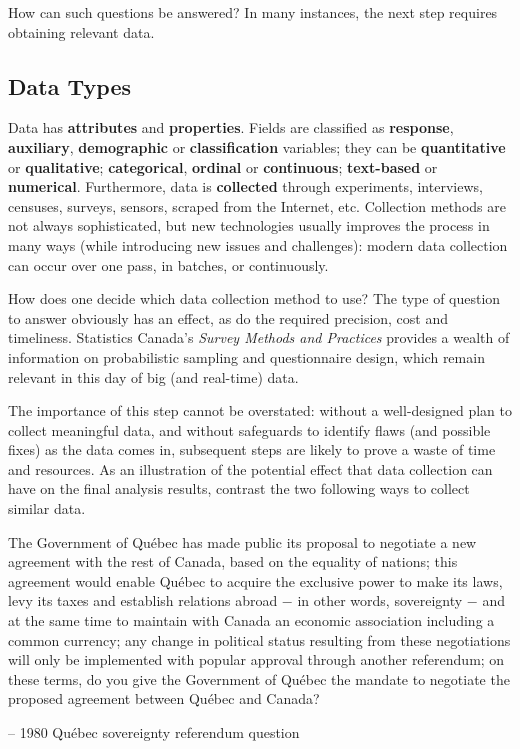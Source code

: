 \noindent How can such questions be answered? In many instances, the next step requires obtaining relevant data.   
\subsection{Data Types} 
Data has \textbf{attributes} and \textbf{properties}. Fields are classified as \textbf{response}, \textbf{auxiliary}, \textbf{demographic} or \textbf{classification} variables; they can be \textbf{quantitative} or \textbf{qualitative}; \textbf{categorical}, \textbf{ordinal} or \textbf{continuous}; \textbf{text-based} or \textbf{numerical}. Furthermore, data is \textbf{collected} through experiments, interviews, censuses, surveys, sensors, scraped from the Internet, etc. 
\newl  Collection methods are not always sophisticated, but new technologies usually improves the process in many ways (while introducing new issues and challenges): modern data collection can occur over one pass, in batches, or continuously.
\par How does one decide which data collection method to use? The type of question to answer obviously has an effect, as do the required precision, cost and timeliness. Statistics Canada's \textit{Survey Methods and Practices} \cite{DS_SC} provides a wealth of information on probabilistic sampling and questionnaire design, which remain relevant in this day of big (and real-time) data. \par The importance of this step cannot be overstated: without a well-designed plan to collect meaningful data, and without safeguards to identify flaws (and possible fixes) as the data comes in, subsequent steps are likely to prove a waste of time and resources. \newl
As an illustration of the potential effect that data collection can have on the final analysis results, contrast the two following ways to collect similar data.
\begin{tcolorbox}[title=Yes. I Mean No. ... I Think.]
The Government of Qu\'ebec has made public its proposal to negotiate a new agreement with the rest of Canada, based on the equality of nations; this agreement would enable Qu\'ebec to acquire the exclusive power to make its laws, levy its taxes and establish relations abroad $-$ in other words, sovereignty $-$ and at the same time to maintain with Canada an economic association including a common currency; any change in political status resulting from these negotiations will only be implemented with popular approval through another referendum; on these terms, do you give the Government of Qu\'ebec the mandate to negotiate the proposed agreement between Qu\'ebec and Canada? \\[-0.6cm]
\begin{flushright}
-- 1980 Qu\'ebec sovereignty referendum question
\end{flushright}
\end{tcolorbox}
